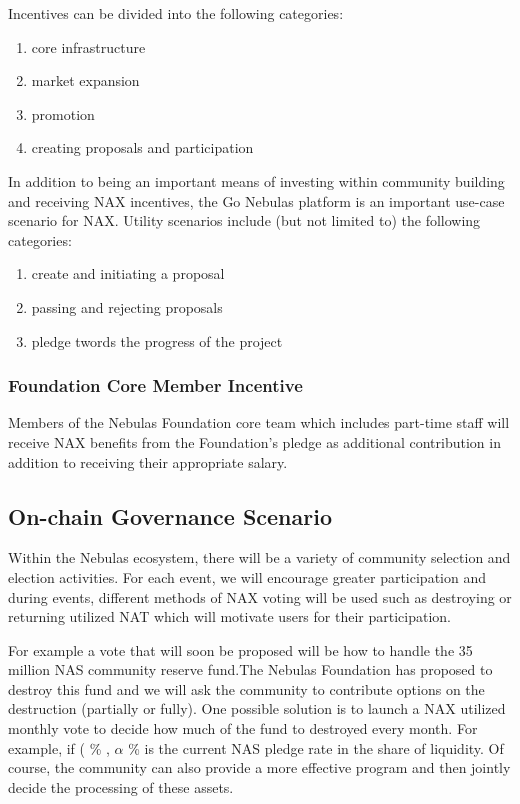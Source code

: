 Incentives can be divided into the following categories:
\begin{enumerate}[\hspace{1cm}(a)]
	\item core infrastructure
	\item market expansion
	\item promotion
	\item creating proposals and participation
\end{enumerate}

In addition to being an important means of investing within community building and receiving NAX incentives, the Go Nebulas platform is an important use-case scenario for NAX. Utility scenarios include (but not limited to) the following categories:
\begin{enumerate}[\hspace{1cm}(a)]
	\item create and initiating a proposal
	\item passing and rejecting proposals
	\item pledge twords the progress of the project
\end{enumerate}

\subsubsection{Foundation Core Member Incentive}
Members of the Nebulas Foundation core team which includes part-time staff will receive NAX benefits from the Foundation's pledge as additional contribution in addition to receiving their appropriate salary.

\subsection{On-chain Governance Scenario}
Within the Nebulas ecosystem, there will be a variety of community selection and election activities. For each event, we will encourage greater participation and during events, different methods of NAX voting will be used such as destroying or returning utilized NAT which will motivate users for their participation.

For example a vote that will soon be proposed will be how to handle the 35 million NAS community reserve fund.The Nebulas Foundation has proposed to destroy this fund and we will ask the community to contribute options on the destruction (partially or fully). One possible solution is to launch a NAX utilized monthly vote to decide how much of the fund to destroyed every month. For example, if (\alpha\) \% , \(\alpha\) \% is the current NAS pledge rate in the share of liquidity. Of course, the community can also provide a more effective program and then jointly decide the processing of these assets.

